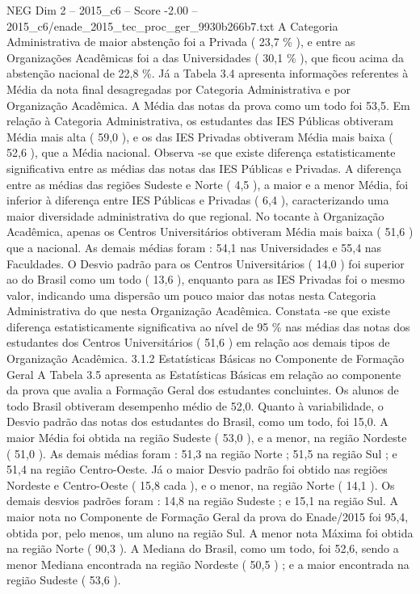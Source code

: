 \begin{textsample}{NEG Dim 2 – 2015\_c6 – Score -2.00 – 2015\_c6/enade\_2015\_tec\_proc\_ger\_9930b266b7.txt}
A Categoria Administrativa de maior abstenção foi a Privada ( 23,7 \% ), e entre as Organizações Acadêmicas foi a das Universidades ( 30,1 \% ), que ficou acima da abstenção nacional de 22,8 \%.
Já a Tabela 3.4 apresenta informações referentes à Média da nota final desagregadas por Categoria Administrativa e por Organização Acadêmica.
A Média das notas da prova como um todo foi 53,5.
Em relação à Categoria Administrativa, os estudantes das IES Públicas obtiveram Média mais alta ( 59,0 ), e os das IES Privadas obtiveram Média mais baixa ( 52,6 ), que a Média nacional.
Observa -se que existe diferença estatisticamente significativa entre as médias das notas das IES Públicas e Privadas.
A diferença entre as médias das regiões Sudeste e Norte ( 4,5 ), a maior e a menor Média, foi inferior à diferença entre IES Públicas e Privadas ( 6,4 ), caracterizando uma maior diversidade administrativa do que regional.
No tocante à Organização Acadêmica, apenas os Centros Universitários obtiveram Média mais baixa ( 51,6 ) que a nacional.
As demais médias foram : 54,1 nas Universidades e 55,4 nas Faculdades.
O Desvio padrão para os Centros Universitários ( 14,0 ) foi superior ao do Brasil como um todo ( 13,6 ), enquanto para as IES Privadas foi o mesmo valor, indicando uma dispersão um pouco maior das notas nesta Categoria Administrativa do que nesta Organização Acadêmica.
Constata -se que existe diferença estatisticamente significativa ao nível de 95 \% nas médias das notas dos estudantes dos Centros Universitários ( 51,6 ) em relação aos demais tipos de Organização Acadêmica. 3.1.2 Estatísticas Básicas no Componente de Formação Geral A Tabela 3.5 apresenta as Estatísticas Básicas em relação ao componente da prova que avalia a Formação Geral dos estudantes concluintes.
Os alunos de todo Brasil obtiveram desempenho médio de 52,0.
Quanto à variabilidade, o Desvio padrão das notas dos estudantes do Brasil, como um todo, foi 15,0.
A maior Média foi obtida na região Sudeste ( 53,0 ), e a menor, na região Nordeste ( 51,0 ).
As demais médias foram : 51,3 na região Norte ; 51,5 na região Sul ; e 51,4 na região Centro-Oeste.
Já o maior Desvio padrão foi obtido nas regiões Nordeste e Centro-Oeste ( 15,8 cada ), e o menor, na região Norte ( 14,1 ).
Os demais desvios padrões foram : 14,8 na região Sudeste ; e 15,1 na região Sul.
A maior nota no Componente de Formação Geral da prova do Enade/2015 foi 95,4, obtida por, pelo menos, um aluno na região Sul.
A menor nota Máxima foi obtida na região Norte ( 90,3 ).
A Mediana do Brasil, como um todo, foi 52,6, sendo a menor Mediana encontrada na região Nordeste ( 50,5 ) ; e a maior encontrada na região Sudeste ( 53,6 ).

\end{textsample}
